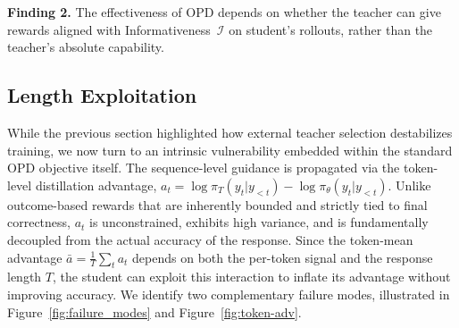 \documentclass[11pt]{article}
\begin{document}

\begin{tcolorbox}[colback=gray!5, colframe=gray!60, boxrule=0.4pt, left=4pt, right=4pt, top=2pt, bottom=2pt]
\textbf{Finding 2.} 
The effectiveness of OPD depends on whether the teacher can give rewards aligned with Informativeness~$\mathcal{I}$ on student's rollouts, rather than the teacher's absolute capability.
\end{tcolorbox}



\subsection{Length Exploitation}
\label{sec:length-hacking}
While the previous section highlighted how external teacher selection destabilizes training, we now turn to an intrinsic vulnerability embedded within the standard OPD objective itself. The sequence-level guidance is propagated via the token-level distillation advantage, $a_t = \log\pi_T(y_t|y_{<t}) - \log\pi_\theta(y_t|y_{<t})$. Unlike outcome-based rewards that are inherently bounded and strictly tied to final correctness, $a_t$ is unconstrained, exhibits high variance, and is fundamentally decoupled from the actual accuracy of the response.
Since the token-mean advantage $\bar{a} = \frac{1}{T}\sum_t a_t$ depends on both the per-token signal and the response length $T$, the student can exploit this interaction to inflate its advantage without improving accuracy. 
We identify two complementary failure modes, illustrated in Figure~\ref{fig:failure_modes} and Figure~\ref{fig:token-adv}.
\end{document}
